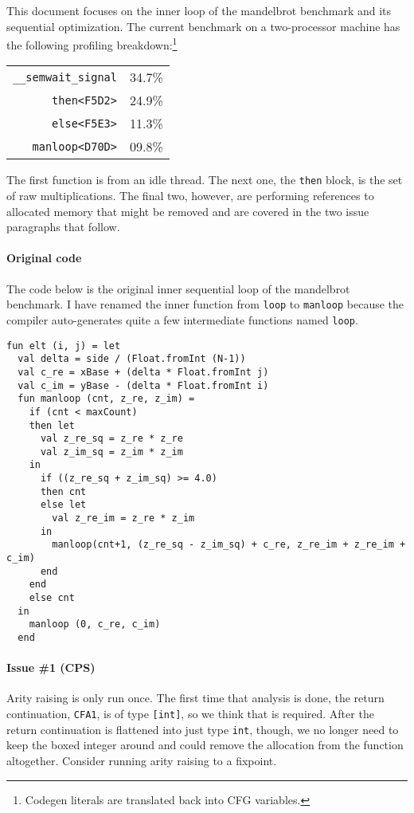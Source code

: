 \documentclass[11pt]{article}
\begin{document}
This document focuses on the inner loop of the mandelbrot benchmark and its sequential optimization. The current benchmark on a two-processor machine has the following profiling breakdown:\footnote{Codegen literals are translated back into CFG variables.}
\begin{center}
\begin{tabular}{r|c}
\texttt{\_\_semwait\_signal} & 34.7\% \\
\texttt{then<F5D2>} & 24.9\% \\
\texttt{else<F5E3>} & 11.3\%\\
\texttt{manloop<D70D>} & 09.8\% \\
\end{tabular}
\end{center}

The first function is from an idle thread. The next one, the \texttt{then} block, is the set of raw multiplications. The final two, however, are performing references to allocated memory that might be removed and are covered in the two issue paragraphs that follow.

\paragraph {Original code}
The code below is the original inner sequential loop of the mandelbrot benchmark. I have renamed the inner function from \texttt{loop} to \texttt{manloop} because the compiler auto-generates quite a few intermediate functions named \texttt{loop}.

\begin{lstlisting}
fun elt (i, j) = let
  val delta = side / (Float.fromInt (N-1))
  val c_re = xBase + (delta * Float.fromInt j)
  val c_im = yBase - (delta * Float.fromInt i)
  fun manloop (cnt, z_re, z_im) = 
    if (cnt < maxCount)
    then let
      val z_re_sq = z_re * z_re
      val z_im_sq = z_im * z_im
    in
      if ((z_re_sq + z_im_sq) >= 4.0)
      then cnt
      else let
        val z_re_im = z_re * z_im
      in
        manloop(cnt+1, (z_re_sq - z_im_sq) + c_re, z_re_im + z_re_im + c_im)
      end
    end
    else cnt
  in
    manloop (0, c_re, c_im)
  end
\end{lstlisting}

\paragraph{Issue \#1 (CPS)}
Arity raising is only run once. The first time that analysis is done, the return continuation, \texttt{CFA1}, is of type \texttt{[int]}, so we think that is required. After the return continuation is flattened into just type \texttt{int}, though, we no longer need to keep the boxed integer around and could remove the allocation from the function altogether. Consider running arity raising to a fixpoint.
\end{document}
